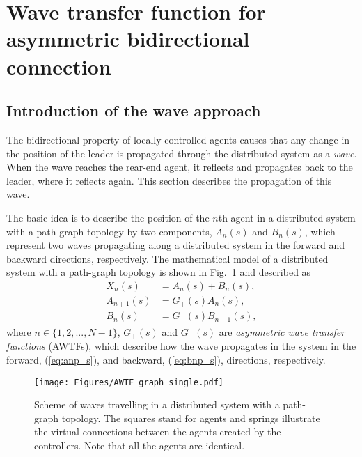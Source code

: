 \documentclass[10pt,twocolumn,twoside]{IEEEtran}
\theoremstyle{definition}
\begin{document}
\section{Wave transfer function for asymmetric bidirectional connection}

\subsection{Introduction of the wave approach}

The bidirectional property of locally controlled agents causes that any change in the position of the leader is propagated through the distributed system as a \emph{wave}. When the wave reaches the rear-end agent, it reflects and propagates back to the leader, where it reflects again. This section describes the propagation of this wave.

The basic idea is to describe the position of the $n$th agent in a distributed system with a path-graph topology by two components, $A_n(s)$ and $B_n(s)$, which represent two waves propagating along a distributed system in the forward and backward directions, respectively. The mathematical model of a distributed system with a path-graph topology is shown in Fig.~\ref{fig:AWTF_graph_single} and described as
\begin{align}
  X_n(s) &= A_n(s) + B_n(s),\label{eq:pos_decomp}\\
  A_{n+1}(s) &= G_{+}(s)A_n(s),\label{eq:anp_s}\\
  B_n(s) &= G_-(s)B_{n+1}(s)\label{eq:bnp_s},
\end{align}
where $n \in \{1, 2,...,N −1\}$, $G_{+}(s)$ and $G_{-}(s)$ are \emph{asymmetric wave transfer functions} (AWTFs), which describe how the wave propagates in the system in the forward, (\ref{eq:anp_s}), and backward, (\ref{eq:bnp_s}), directions, respectively.
\begin{figure}[ht]
 \centering
  \texttt{[image: Figures/AWTF\_graph\_single.pdf]}
  \caption{Scheme of waves travelling in a distributed system with a path-graph topology. The squares stand for agents and springs illustrate the virtual connections between the agents created by the controllers. Note that all the agents are identical.}
  \label{fig:AWTF_graph_single}
\end{figure}
\end{document}
